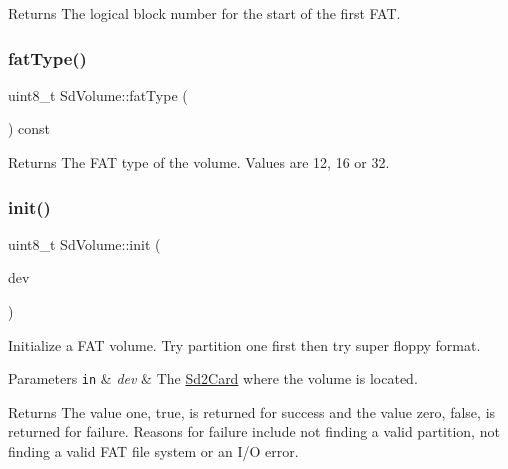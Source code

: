 \begin{DoxyReturn}{Returns}
The logical block number for the start of the first F\+AT. 
\end{DoxyReturn}
\mbox{\label{class_sd_volume_a85adb29d404b08b1b58e9f105b60ea8d}} 
\subsubsection{\texorpdfstring{fat\+Type()}{fatType()}}
{\footnotesize\ttfamily uint8\+\_\+t Sd\+Volume\+::fat\+Type (\begin{DoxyParamCaption}\item[{void}]{ }\end{DoxyParamCaption}) const\hspace{0.3cm}{\ttfamily [inline]}}

\begin{DoxyReturn}{Returns}
The F\+AT type of the volume. Values are 12, 16 or 32. 
\end{DoxyReturn}
\mbox{\label{class_sd_volume_adfcf83cba537b831f3a993a058e7ca85}} 
\subsubsection{\texorpdfstring{init()}{init()}\hspace{0.1cm}{\footnotesize\ttfamily [1/4]}}
{\footnotesize\ttfamily uint8\+\_\+t Sd\+Volume\+::init (\begin{DoxyParamCaption}\item[{\hyperlink{class_sd2_card}{Sd2\+Card} $\ast$}]{dev }\end{DoxyParamCaption})\hspace{0.3cm}{\ttfamily [inline]}}

Initialize a F\+AT volume. Try partition one first then try super floppy format.


\begin{DoxyParams}[1]{Parameters}
\mbox{\tt in}  & {\em dev} & The \hyperlink{class_sd2_card}{Sd2\+Card} where the volume is located.\\
\hline
\end{DoxyParams}
\begin{DoxyReturn}{Returns}
The value one, true, is returned for success and the value zero, false, is returned for failure. Reasons for failure include not finding a valid partition, not finding a valid F\+AT file system or an I/O error. 
\end{DoxyReturn}
\mbox{\label{class_sd_volume_a8f5879e458ea6f1a2a2a2b884d800550}} 
